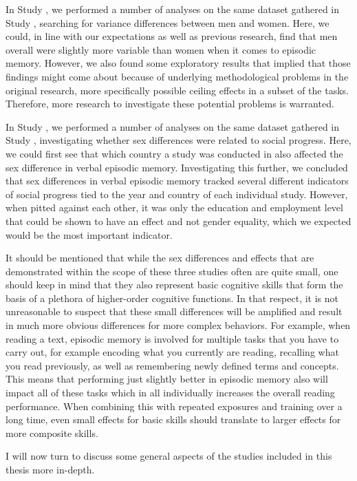 In Study , we performed a number of analyses on the same dataset gathered in Study , searching for variance differences between men and women. Here, we could, in line with our expectations as well as previous research, find that men overall were slightly more variable than women when it comes to episodic memory. However, we also found some exploratory results that implied that those findings might come about because of underlying methodological problems in the original research, more specifically possible ceiling effects in a subset of the tasks. Therefore, more research to investigate these potential problems is warranted.

In Study , we performed a number of analyses on the same dataset gathered in Study , investigating whether sex differences were related to social progress. Here, we could first see that which country a study was conducted in also affected the sex difference in verbal episodic memory. Investigating this further, we concluded that sex differences in verbal episodic memory tracked several different indicators of social progress tied to the year and country of each individual study. However, when pitted against each other, it was only the education and employment level that could be shown to have an effect and not gender equality, which we expected would be the most important indicator.

It should be mentioned that while the sex differences and effects that are demonstrated within the scope of these three studies often are quite small, one should keep in mind that they also represent basic cognitive skills that form the basis of a plethora of higher-order cognitive functions. In that respect, it is not unreasonable to suspect that these small differences will be amplified and result in much more obvious differences for more complex behaviors. For example, when reading a text, episodic memory is involved for multiple tasks that you have to carry out, for example encoding what you currently are reading, recalling what you read previously, as well as remembering newly defined terms and concepts. This means that performing just slightly better in episodic memory also will impact all of these tasks which in all individually increases the overall reading performance. When combining this with repeated exposures and training over a long time, even small effects for basic skills should translate to larger effects for more composite skills.

I will now turn to discuss some general aspects of the studies included in this thesis more in-depth.

